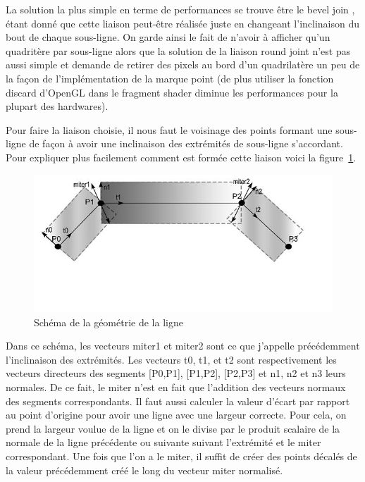 \documentclass[12pt]{article}
\begin{document}
La solution la plus simple en terme de performances se trouve être le \og bevel join \fg{}, étant donné que cette liaison peut-être réalisée juste en changeant l’inclinaison du bout de chaque sous-ligne. On garde ainsi le fait de n’avoir à afficher qu’un
quadritère par sous-ligne alors que la solution de la liaison  \og round joint \fg{} n’est pas aussi simple et demande de
retirer des pixels au bord d’un quadrilatère un peu de la façon de l’implémentation de la marque point (de plus utiliser la
fonction discard d’OpenGL dans le fragment shader diminue les performances pour la plupart des hardwares\cite{FragmentDiscard}).

Pour faire la liaison choisie, il nous faut le voisinage des points formant une sous-ligne de façon à avoir une inclinaison des
extrémités de sous-ligne s’accordant. Pour expliquer plus facilement comment est formée cette liaison voici la figure~\ref{fig:geom_line}.

\begin{figure}[htp]
  \centering
  \includegraphics[scale=0.8]{images/line_geom}
  \caption{Schéma de la géométrie de la ligne}
  \label{fig:geom_line}
\end{figure}

Dans ce schéma, les vecteurs miter1 et miter2 sont ce que j’appelle précédemment l’inclinaison des extrémités. Les vecteurs t0,
t1, et t2 sont respectivement les vecteurs directeurs des segments [P0,P1], [P1,P2], [P2,P3] et n1, n2 et n3 leurs normales. De
ce fait, le miter n’est en fait que l’addition des vecteurs normaux des segments correspondants. Il faut aussi calculer la
valeur d’écart par rapport au point d’origine pour avoir une ligne avec une largeur correcte. Pour cela, on prend la largeur
voulue de la ligne et on le divise par le produit scalaire de la normale de la ligne précédente ou suivante suivant l’extrémité et le miter correspondant. Une fois que l’on a le miter, il suffit de créer des points décalés de la valeur précédemment créé le long du vecteur miter normalisé.
\end{document}
